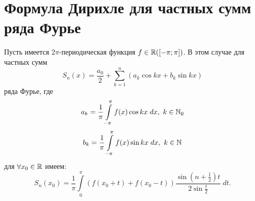 \documentclass[../../main.tex]{subfiles}
\begin{document}
\section{Формула Дирихле для частных сумм ряда Фурье}
\begin{thm}
	Пусть имеется $2\pi$-периодическая функция $f \in \mathbb{R}([-\pi;\pi])$. В этом 
	случае для частных сумм
	\begin{equation}
		\label{18:1}
		S_n(x) = \dfrac{a_0}{2} + \sum_{k=1}^{n}(a_k\cos{kx} + b_k\sin{kx})
	\end{equation} 
	ряда Фурье, где
	\begin{equation}
		\label{18:2}
		a_k = \dfrac{1}{\pi}\int\limits_{-\pi}^{\pi}{f(x)\cos{kx}\; dx},\ k \in \mathbb{N}_0
	\end{equation}
	\begin{equation}
		\label{18:3}
		b_k = \dfrac{1}{\pi}\int\limits_{-\pi}^{\pi}{f(x)\sin{kx}\; dx},\ k \in \mathbb{N}
	\end{equation}
	для $\forall x_0 \in \mathbb{R}$ имеем:
	\begin{equation}
		\label{18:4}
		S_n(x_0)=\dfrac{1}{\pi}\int\limits_{0}^{\pi}({f(x_0 + t) + f(x_0 - t)})
		\dfrac{\sin(n + \frac{1}{2})t}{2\sin{\frac{t}{2}}}\; dt.
	\end{equation}
\end{thm}
\end{document}
